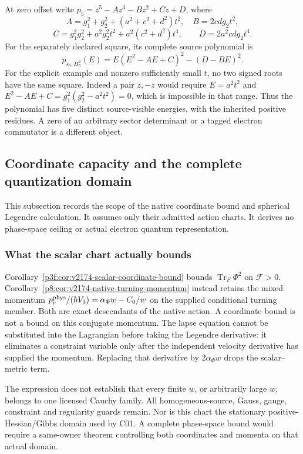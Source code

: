 \documentclass[11pt,a4paper]{article}
\begin{document}
At zero offset write \(p_5=z^5-Az^3-Bz^2+Cz+D\), where
\[
 A=g_1^2+g_2^2+(a^2+c^2+d^2)t^2,\quad B=2cdg_2t^2,
\]
\[
 C=g_1^2g_2^2+a^2g_2^2t^2+a^2(c^2+d^2)t^4,
 \qquad D=2a^2cdg_2t^4.
\]
For the separately declared square, its complete source polynomial is
\begin{equation}
 p_{s_0,H_5^2}(E)=E(E^2-AE+C)^2-(D-BE)^2.
 \label{p3f:eq:native-mixed-square-polynomial}
\end{equation}
For the explicit example and nonzero sufficiently small \(t\), no
two signed roots have the same square. Indeed a pair \(z,-z\) would
require \(E=a^2t^2\) and
\(E^2-AE+C=g_1^2(g_2^2-a^2t^2)=0\), which is impossible in that
range. Thus the polynomial has five distinct source-visible energies,
with the inherited positive residues. A zero of an arbitrary sector
determinant or a tagged electron commutator is a different object.




\subsection{Coordinate capacity and the complete quantization domain}
\label{p3f:app:v2174-native-capacity-domain}
This subsection records the scope of the native coordinate bound and spherical
Legendre calculation. It assumes only their admitted action charts. It
derives no phase-space ceiling or actual electron quantum representation.

\subsubsection{What the scalar chart actually bounds}
Corollary~\ref{p3f:cor:v2174-scalar-coordinate-bound} bounds
$\operatorname{Tr}_F\Phi^2$ on $\mathscr F>0$.
Corollary~\ref{p8:cor:v2174-native-turning-momentum} instead retains the
mixed momentum $p_r^{\rm phys}/(\hbar V_3)=\alpha_\Phi w-C_0/w$ on
the supplied conditional turning member. Both are exact descendants of the
native action. A coordinate bound is not a bound on this conjugate momentum.
The lapse equation cannot be substituted into the Lagrangian before taking
the Legendre derivative: it eliminates a constraint variable only after
the independent velocity derivative has supplied the momentum. Replacing
that derivative by $2\alpha_\Phi w$ drops the scalar--metric term.

The expression does not establish that every finite $w$, or arbitrarily
large $w$, belongs to one licensed Cauchy family. All homogeneous-source,
Gauss, gauge, constraint and regularity guards remain. Nor is this chart
the stationary positive-Hessian/Gibbs domain used by C01. A complete
phase-space bound would require a same-owner theorem controlling both
coordinates and momenta on that actual domain.
\end{document}
